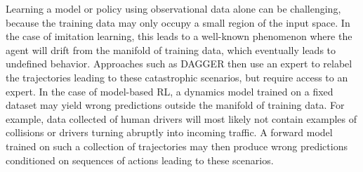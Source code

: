 \documentclass{article} %
\begin{document}
Learning a model or policy using observational data alone can be challenging, because the training data may only occupy a small region of the input space.
In the case of imitation learning, this leads to a well-known phenomenon where the agent will drift from the manifold of training data, which eventually leads to undefined behavior.
Approaches such as DAGGER then use an expert to relabel the trajectories leading to these catastrophic scenarios, but require access to an expert.
In the case of model-based RL, a dynamics model trained on a fixed dataset may yield wrong predictions outside the manifold of training data.
For example, data collected of human drivers will most likely not contain examples of collisions or drivers turning abruptly into incoming traffic.
A forward model trained on such a collection of trajectories may then produce wrong predictions conditioned on sequences of actions leading to these scenarios.


\end{document}
